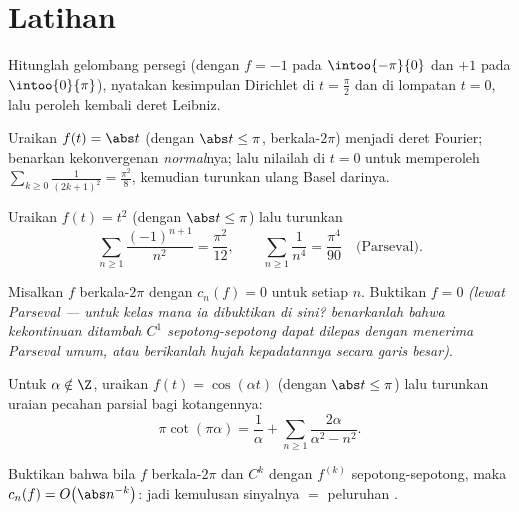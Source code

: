 \section{Latihan}

\begin{exercise}[$\star$]\label{exo:b2:fourier:1}
Hitunglah  gelombang persegi (dengan $f = -1$ pada
$\intoo{-\pi}{0}$ dan $+1$ pada $\intoo{0}{\pi}$), nyatakan kesimpulan
Dirichlet di $t = \frac\pi2$ dan di lompatan $t = 0$, lalu peroleh kembali
deret Leibniz.
\end{exercise}

\begin{exercise}[$\star$]\label{exo:b2:fourier:2}
Uraikan $f(t) = \abs t$ (dengan $\abs t \leq \pi$, berkala-$2\pi$) menjadi
deret Fourier; benarkan kekonvergenan \emph{normal}nya; lalu nilailah di $t =
0$ untuk memperoleh $\sum_{k\geq0}\frac{1}{(2k+1)^2} = \frac{\pi^2}{8}$,
kemudian turunkan ulang Basel darinya.
\end{exercise}

\begin{exercise}[$\star$]\label{exo:b2:fourier:3}
Uraikan $f(t) = t^2$ (dengan $\abs t \leq \pi$) lalu turunkan
\[
\sum_{n\geq1}\frac{(-1)^{n+1}}{n^2} = \frac{\pi^2}{12},
\qquad
\sum_{n\geq1}\frac{1}{n^4} = \frac{\pi^4}{90}
\quad\text{(Parseval)}.
\]
\end{exercise}

\begin{exercise}[$\star\star$]\label{exo:b2:fourier:4}
Misalkan $f$  berkala-$2\pi$ dengan $c_n(f) = 0$ untuk setiap
$n$. Buktikan $f = 0$ \emph{(lewat Parseval --- untuk kelas mana ia dibuktikan
di sini? benarkanlah bahwa kekontinuan ditambah $C^1$ sepotong-sepotong dapat dilepas
dengan menerima Parseval umum, atau berikanlah hujah kepadatannya secara garis besar)}.
\end{exercise}

\begin{exercise}[$\star\star$]\label{exo:b2:fourier:5}
Untuk $\alpha \notin \Z$, uraikan $f(t) = \cos(\alpha t)$ (dengan $\abs t
\leq \pi$) lalu turunkan uraian pecahan parsial bagi
kotangennya:
\[
\pi\cot(\pi\alpha) = \frac{1}{\alpha} + \sum_{n\geq1}
\frac{2\alpha}{\alpha^2 - n^2} .
\]
\end{exercise}

\begin{exercise}[$\star\star$]\label{exo:b2:fourier:6}
Buktikan bahwa bila $f$ berkala-$2\pi$ dan $C^k$ dengan $f^{(k)}$
 sepotong-sepotong, maka $c_n(f) = O\bigl(\abs n^{-k}\bigr)$: jadi
kemulusan sinyalnya $=$ peluruhan .
\end{exercise}

